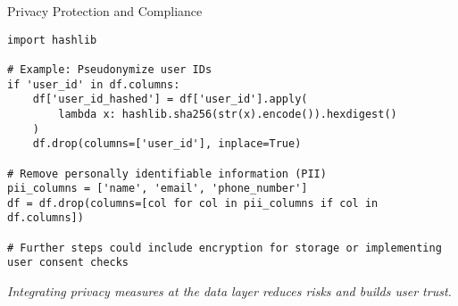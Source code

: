 \documentclass[aspectratio=169]{beamer}
\begin{document}
%
%
\begin{frame}{Privacy Protection and Compliance}
\begin{verbatim}
import hashlib

# Example: Pseudonymize user IDs
if 'user_id' in df.columns:
    df['user_id_hashed'] = df['user_id'].apply(
        lambda x: hashlib.sha256(str(x).encode()).hexdigest()
    )
    df.drop(columns=['user_id'], inplace=True)

# Remove personally identifiable information (PII)
pii_columns = ['name', 'email', 'phone_number']
df = df.drop(columns=[col for col in pii_columns if col in df.columns])

# Further steps could include encryption for storage or implementing user consent checks
\end{verbatim}

\vspace{0.8em}
\emph{Integrating privacy measures at the data layer reduces risks and builds user trust.}
\end{frame}
\end{document}
